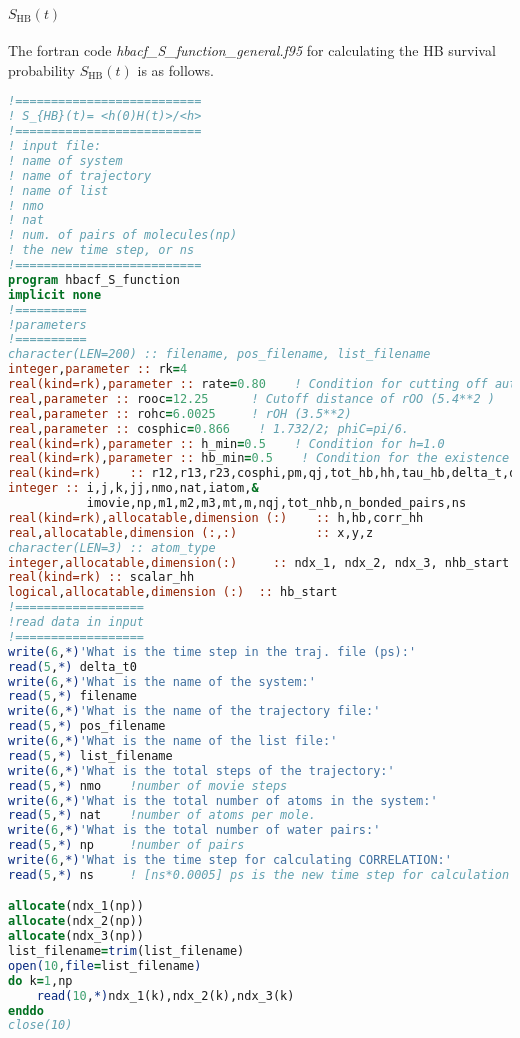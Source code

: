 \paragraph{$S_{\text{HB}}(t)$}
The fortran code \emph{hbacf\_S\_function\_general.f95} for calculating the HB survival probability $S_{\text{HB}}(t)$ is as follows.
\begin{lstlisting}[language=fortran]
!==========================
! S_{HB}(t)= <h(0)H(t)>/<h>
!==========================
! input file: 
! name of system
! name of trajectory
! name of list
! nmo
! nat
! num. of pairs of molecules(np)
! the new time step, or ns
!==========================
program hbacf_S_function
implicit none
!==========
!parameters
!==========
character(LEN=200) :: filename, pos_filename, list_filename
integer,parameter :: rk=4
real(kind=rk),parameter :: rate=0.80    ! Condition for cutting off auto-correlation functions
real,parameter :: rooc=12.25      ! Cutoff distance of rOO (5.4**2 )
real,parameter :: rohc=6.0025     ! rOH (3.5**2)
real,parameter :: cosphic=0.866    ! 1.732/2; phiC=pi/6.
real(kind=rk),parameter :: h_min=0.5    ! Condition for h=1.0
real(kind=rk),parameter :: hb_min=0.5    ! Condition for the existence of h-bond
real(kind=rk)    :: r12,r13,r23,cosphi,pm,qj,tot_hb,hh,tau_hb,delta_t,delta_t0
integer :: i,j,k,jj,nmo,nat,iatom,&
           imovie,np,m1,m2,m3,mt,m,nqj,tot_nhb,n_bonded_pairs,ns
real(kind=rk),allocatable,dimension (:)    :: h,hb,corr_hh
real,allocatable,dimension (:,:)           :: x,y,z
character(LEN=3) :: atom_type    
integer,allocatable,dimension(:)     :: ndx_1, ndx_2, ndx_3, nhb_start
real(kind=rk) :: scalar_hh
logical,allocatable,dimension (:)  :: hb_start
!==================
!read data in input
!==================
write(6,*)'What is the time step in the traj. file (ps):'
read(5,*) delta_t0
write(6,*)'What is the name of the system:'
read(5,*) filename
write(6,*)'What is the name of the trajectory file:'
read(5,*) pos_filename
write(6,*)'What is the name of the list file:'
read(5,*) list_filename
write(6,*)'What is the total steps of the trajectory:'
read(5,*) nmo    !number of movie steps
write(6,*)'What is the total number of atoms in the system:'
read(5,*) nat    !number of atoms per mole.
write(6,*)'What is the total number of water pairs:'
read(5,*) np     !number of pairs
write(6,*)'What is the time step for calculating CORRELATION:'
read(5,*) ns     ! [ns*0.0005] ps is the new time step for calculation

allocate(ndx_1(np))
allocate(ndx_2(np))
allocate(ndx_3(np))
list_filename=trim(list_filename)
open(10,file=list_filename)
do k=1,np
    read(10,*)ndx_1(k),ndx_2(k),ndx_3(k)
enddo
close(10)


\end{lstlisting}
